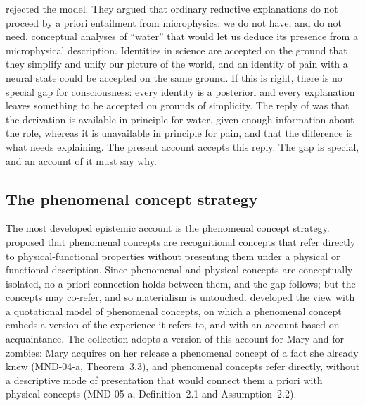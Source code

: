 \documentclass{situationist-preprint}
\begin{document}
\citet{BlockStalnaker1999} rejected the model. They argued that ordinary reductive explanations do not proceed by a priori entailment from microphysics: we do not have, and do not need, conceptual analyses of \enquote{water} that would let us deduce its presence from a microphysical description. Identities in science are accepted on the ground that they simplify and unify our picture of the world, and an identity of pain with a neural state could be accepted on the same ground. If this is right, there is no special gap for consciousness: every identity is a posteriori and every explanation leaves something to be accepted on grounds of simplicity. The reply of \citet{ChalmersJackson2001} was that the derivation is available in principle for water, given enough information about the role, whereas it is unavailable in principle for pain, and that the difference is what needs explaining. The present account accepts this reply. The gap is special, and an account of it must say why.

\subsection{The phenomenal concept strategy}

The most developed epistemic account is the phenomenal concept strategy. \citet{Loar1990} proposed that phenomenal concepts are recognitional concepts that refer directly to physical-functional properties without presenting them under a physical or functional description. Since phenomenal and physical concepts are conceptually isolated, no a priori connection holds between them, and the gap follows; but the concepts may co-refer, and so materialism is untouched. \citet{Papineau2002} developed the view with a quotational model of phenomenal concepts, on which a phenomenal concept embeds a version of the experience it refers to, and \citet{Balog2012} with an account based on acquaintance. The collection adopts a version of this account for Mary and for zombies: Mary acquires on her release a phenomenal concept of a fact she already knew (MND-04-a, Theorem~3.3), and phenomenal concepts refer directly, without a descriptive mode of presentation that would connect them a priori with physical concepts (MND-05-a, Definition~2.1 and Assumption~2.2).
\end{document}
